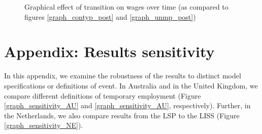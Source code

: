 

\begin{sidewaysfigure}
    \caption{Graphical effect of transition on wages over time (as compared to figures \ref{graph_contyp_post} and  \ref{graph_unmp_post})}
    \label{graph_sensitivity_post_censoring}
\end{sidewaysfigure}


\clearpage
\section{Appendix: Results sensitivity}\label{appendix:sensitivity_variable}
\setcounter{table}{0}
\setcounter{figure}{0}
\renewcommand*\thetable{\Alph{section}.\arabic{table}}
\renewcommand*\thefigure{\Alph{section}.\arabic{figure}}
\renewcommand{\theHfigure}{\Alph{section}.\arabic{table}}
\renewcommand{\theHtable}{\Alph{section}.\arabic{figure}}

In this appendix, we examine the robustness of the results to distinct model specifications or definitions of event.  In Australia and in the United Kingdom, we compare different definitions of temporary employment (Figure \ref{graph_sensitivity_AU} and \ref{graph_sensitivity_AU}, respectively).  Further, in the Netherlands, we also compare results from the LSP to the LISS (Figure \ref{graph_sensitivity_NE}).  



